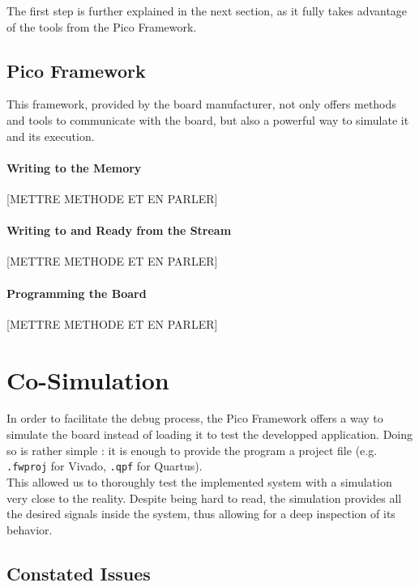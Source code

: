 The first step is further explained in the next section, as it fully takes advantage of the tools from the Pico Framework.


\subsection{Pico Framework}

This framework, provided by the board manufacturer, not only offers methods and tools to communicate with the board, but also a powerful way to simulate it and its execution.

\paragraph{Writing to the Memory}

[METTRE METHODE ET EN PARLER]

\paragraph{Writing to and Ready from the Stream}

[METTRE METHODE ET EN PARLER]

\paragraph{Programming the Board}

[METTRE METHODE ET EN PARLER]

\section{Co-Simulation}

In order to facilitate the debug process, the Pico Framework offers a way to simulate the board instead of loading it to test the developped application. Doing so is rather simple : it is enough to provide the program a project file (e.g. \texttt{.fwproj} for Vivado, \texttt{.qpf} for Quartus).\\

This allowed us to thoroughly test the implemented system with a simulation very close to the reality. Despite being hard to read, the simulation provides all the desired signals inside the system, thus allowing for a deep inspection of its behavior.

\subsection{Constated Issues}

